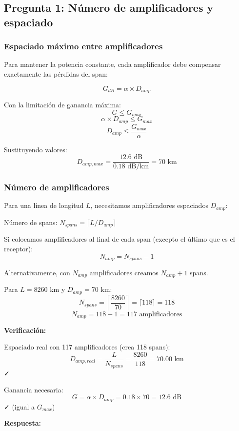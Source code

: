 \documentclass[a4paper,10pt]{article}
\begin{document}
\subsection{Pregunta 1: Número de amplificadores y espaciado}

\subsubsection{Espaciado máximo entre amplificadores}

Para mantener la potencia constante, cada amplificador debe compensar exactamente las pérdidas del span:

$$G_{dB} = \alpha \times D_{amp}$$

Con la limitación de ganancia máxima:
$$G \leq G_{max}$$
$$\alpha \times D_{amp} \leq G_{max}$$
$$D_{amp} \leq \frac{G_{max}}{\alpha}$$

Sustituyendo valores:
$$D_{amp,max} = \frac{12.6 \text{ dB}}{0.18 \text{ dB/km}} = \boxed{70 \text{ km}}$$

\subsubsection{Número de amplificadores}

Para una línea de longitud $L$, necesitamos amplificadores espaciados $D_{amp}$:

Número de spans: $N_{spans} = \lceil L / D_{amp} \rceil$

Si colocamos amplificadores al final de cada span (excepto el último que es el receptor):
$$N_{amp} = N_{spans} - 1$$

Alternativamente, con $N_{amp}$ amplificadores creamos $N_{amp} + 1$ spans.

Para $L = 8260$ km y $D_{amp} = 70$ km:
$$N_{spans} = \left\lceil \frac{8260}{70} \right\rceil = \lceil 118 \rceil = 118$$
$$N_{amp} = 118 - 1 = \boxed{117 \text{ amplificadores}}$$

\textbf{Verificación:}

Espaciado real con 117 amplificadores (crea 118 spans):
$$D_{amp,real} = \frac{L}{N_{spans}} = \frac{8260}{118} = 70.00 \text{ km}$$ ✓

Ganancia necesaria:
$$G = \alpha \times D_{amp} = 0.18 \times 70 = 12.6 \text{ dB}$$ ✓ (igual a $G_{max}$)

\textbf{Respuesta:}
\begin{center}
\end{center}
\end{document}
